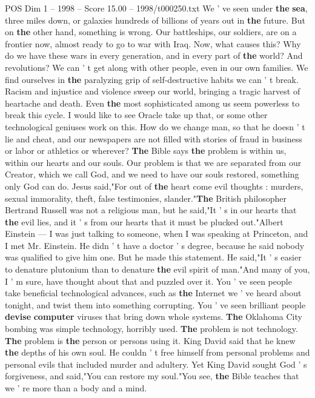 \begin{textsample}{POS Dim 1 – 1998 – Score 15.00 – 1998/t000250.txt}
We ' ve seen under \textbf{the} \textbf{sea}, three miles down, or galaxies hundreds of billions of years out in \textbf{the} future.
But on \textbf{the} other hand, something is wrong.
Our battleships, our soldiers, are on a frontier now, almost ready to go to war with Iraq.
Now, what causes this?
Why do we have these wars in every generation, and in every part of \textbf{the} world?
And revolutions?
We can ' t get along with other people, even in our own families.
We find ourselves in \textbf{the} paralyzing grip of self-destructive habits we can ' t break.
Racism and injustice and violence sweep our world, bringing a tragic harvest of heartache and death.
Even \textbf{the} most sophisticated among us seem powerless to break this cycle.
I would like to see Oracle take up that, or some other technological geniuses work on this.
How do we change man, so that he doesn ' t lie and cheat, and our newspapers are not filled with stories of fraud in business or labor or athletics or wherever? \textbf{The} Bible says \textbf{the} problem is within us, within our hearts and our souls.
Our problem is that we are separated from our Creator, which we call God, and we need to have our souls restored, something only God can do.
Jesus said,"For out of \textbf{the} heart come evil thoughts : murders, sexual immorality, theft, false testimonies, slander."\textbf{The} British philosopher Bertrand Russell was not a religious man, but he said,"It ' s in our hearts that \textbf{the} evil lies, and it ' s from our hearts that it must be plucked out."Albert Einstein — I was just talking to someone, when I was speaking at Princeton, and I met Mr.
Einstein.
He didn ' t have a doctor ' s degree, because he said nobody was qualified to give him one.
But he made this statement.
He said,"It ' s easier to denature plutonium than to denature \textbf{the} evil spirit of man."And many of you, I ' m sure, have thought about that and puzzled over it.
You ' ve seen people take beneficial technological advances, such as \textbf{the} Internet we ' ve heard about tonight, and twist them into something corrupting.
You ' ve seen brilliant people \textbf{devise} \textbf{computer} viruses that bring down whole systems. \textbf{The} Oklahoma City bombing was simple technology, horribly used. \textbf{The} problem is not technology. \textbf{The} problem is \textbf{the} person or persons using it.
King David said that he knew \textbf{the} depths of his own soul.
He couldn ' t free himself from personal problems and personal evils that included murder and adultery.
Yet King David sought God ' s forgiveness, and said,"You can restore my soul."You see, \textbf{the} Bible teaches that we ' re more than a body and a mind.

\end{textsample}
